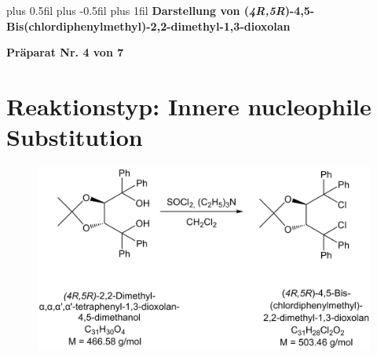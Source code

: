 \documentclass[12pt]{article}
\begin{document}
\begingroup
\leftskip=0cm plus 0.5fil \rightskip=0cm plus -0.5fil
\parfillskip=0cm plus 1fil
 \textbf{\large Darstellung von (\textit{4R,5R})-4,5-Bis(chlordiphenylmethyl)-2,2-dimethyl-1,3-dioxolan}\par
\endgroup

\begin{center}
 \textbf{Präparat Nr. 4 von 7}
\end{center}
\section{Reaktionstyp: \textnormal{Innere nucleophile Substitution} }
\begin{figure}[ht]
\centering
\includegraphics[width=\textwidth]{reaktion.png}
\end{figure}
\end{document}
